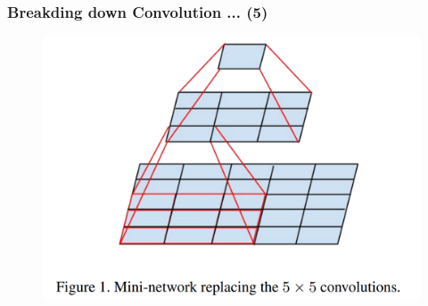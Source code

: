 \documentclass[9pt]{beamer}
\begin{document}
\begin{frame}
	\frametitle{Breakding down Convolution ... (5)}
	\begin{figure}
		\includegraphics[width=\textwidth]{./figures/edit/5x5.png}
	\end{figure}
\end{frame}
\end{document}
